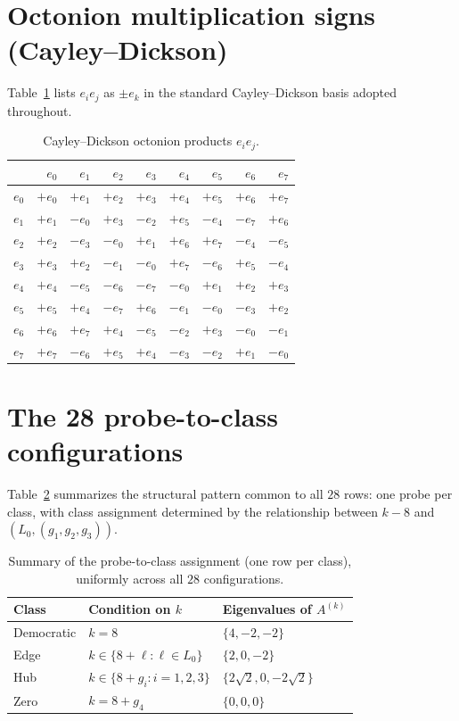 \documentclass[12pt,a4paper]{article}
\begin{document}
\FloatBarrier
\appendix
\section{Octonion multiplication signs (Cayley--Dickson)}\label{app:mult}
Table~\ref{tab:oct} lists $e_ie_j$ as $\pm e_k$ in the standard Cayley--Dickson basis adopted throughout.

\begin{table}[ht]
\centering
\small
\begin{tabular}{r|rrrrrrrr}
\toprule
      & $e_0$ & $e_1$ & $e_2$ & $e_3$ & $e_4$ & $e_5$ & $e_6$ & $e_7$\\\hline
$e_0$ & $+e_0$ & $+e_1$ & $+e_2$ & $+e_3$ & $+e_4$ & $+e_5$ & $+e_6$ & $+e_7$\\
$e_1$ & $+e_1$ & $-e_0$ & $+e_3$ & $-e_2$ & $+e_5$ & $-e_4$ & $-e_7$ & $+e_6$\\
$e_2$ & $+e_2$ & $-e_3$ & $-e_0$ & $+e_1$ & $+e_6$ & $+e_7$ & $-e_4$ & $-e_5$\\
$e_3$ & $+e_3$ & $+e_2$ & $-e_1$ & $-e_0$ & $+e_7$ & $-e_6$ & $+e_5$ & $-e_4$\\
$e_4$ & $+e_4$ & $-e_5$ & $-e_6$ & $-e_7$ & $-e_0$ & $+e_1$ & $+e_2$ & $+e_3$\\
$e_5$ & $+e_5$ & $+e_4$ & $-e_7$ & $+e_6$ & $-e_1$ & $-e_0$ & $-e_3$ & $+e_2$\\
$e_6$ & $+e_6$ & $+e_7$ & $+e_4$ & $-e_5$ & $-e_2$ & $+e_3$ & $-e_0$ & $-e_1$\\
$e_7$ & $+e_7$ & $-e_6$ & $+e_5$ & $+e_4$ & $-e_3$ & $-e_2$ & $+e_1$ & $-e_0$\\
\bottomrule
\end{tabular}
\caption{Cayley--Dickson octonion products $e_ie_j$.}\label{tab:oct}
\end{table}

\section{The 28 probe-to-class configurations}
\label{app:configs}

Table~\ref{tab:summary} summarizes the structural pattern common to all $28$ rows: one probe per class, with class assignment determined by the relationship between $k - 8$ and $(L_0, (g_1, g_2, g_3))$.

\begin{table}[h]
\centering
\caption{Summary of the probe-to-class assignment (one row per class), uniformly across all $28$ configurations.}
\label{tab:summary}
\begin{tabular}{l|l|l}
\toprule
Class & Condition on $k$ & Eigenvalues of $A^{(k)}$ \\
\midrule
Democratic & $k = 8$ & $\{4, -2, -2\}$ \\
Edge & $k \in \{8 + \ell : \ell \in L_0\}$ & $\{2, 0, -2\}$ \\
Hub & $k \in \{8 + g_i : i = 1, 2, 3\}$ & $\{2\sqrt{2}, 0, -2\sqrt{2}\}$ \\
Zero & $k = 8 + g_4$ & $\{0, 0, 0\}$ \\
\bottomrule
\end{tabular}
\end{table}
\end{document}
